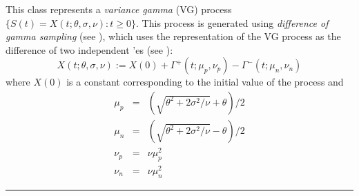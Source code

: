 %
%


This class represents a \emph{variance gamma} (VG) process
$\{S(t) = X(t; \theta, \sigma, \nu) : t \geq 0\}$.
This process is generated using \emph{difference of gamma sampling}
(see \cite{fAVR03a,fAVR06a}), which uses the representation of the VG process
as the difference of two independent 'es (see \cite{fMAD98a}):
\begin{equation}
X(t; \theta, \sigma, \nu) := X(0) + \Gamma^{+}(t; \mu_{p}, \nu_{p})
                                  - \Gamma^{-}(t; \mu_{n}, \nu_{n})
\label{dblGammaEqn}
\end{equation}
where $X(0)$ is a constant corresponding to the initial value of the process
and
\begin{equation}
\begin{array}{rcl}
\mu_{p} & = & (\sqrt{ \theta^{2} + 2\sigma^{2}/\nu } + \theta)/2  \\[6pt]
\mu_{n} & = & (\sqrt{ \theta^{2} + 2\sigma^{2}/\nu } - \theta)/2 \\[6pt]
\nu_{p} & = & \nu \mu_{p}^{2}\\[8pt]
\nu_{n} & = & \nu \mu_{n}^{2}
\end{array}
\label{dblGammaParams}
\end{equation}

\bigskip\hrule\bigskip


